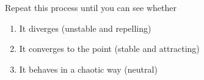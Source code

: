 \documentclass{beamer}
\begin{document}
\begin{frame}[shrink]
\begin{columns}
\begin{column}{.5\textwidth}
\begin{figure}
                \end{figure}
            \end{column}
        \end{columns}
    \end{frame}
    \begin{frame}
        Repeat this process until you can see whether
        \begin{enumerate}
            \item It diverges (unstable and repelling)
            \item It converges to the point (stable and attracting)
            \item It behaves in a chaotic way (neutral)
        \end{enumerate}
    \end{frame}
\end{document}
